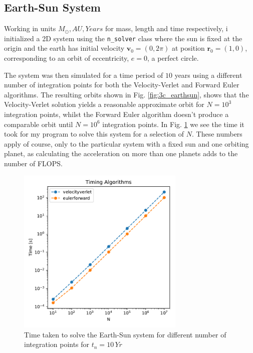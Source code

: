 \documentclass[10pt,showpacs,preprintnumbers,amsmath,amssymb,nofootinbib,aps,prl,twocolumn,groupedaddress,superscriptaddress,showkeys]{revtex4-1}
\begin{document}
  \subsection{Earth-Sun System}

    Working in units $M_\odot, AU, Years$ for mass, length and time respectively, i initialized a 2D system using the \lstinline{n_solver} class where the sun is fixed at the origin and the earth has initial velocity $\mathbf v_0 = (0, 2\pi)$ at position $\mathbf r_0 = (1, 0)$, corresponding to an orbit of eccentricity, $e=0$, a perfect circle.
    

    The system was then simulated for a time period of $10$ years using a different number of integration points for both the Velocity-Verlet and Forward Euler algorithms. The resulting orbits shown in Fig. \ref{fig:3c_earthsun}, shows that the Velocity-Verlet solution yields a reasonable approximate orbit for $N=10^3$ integration points, whilst the Forward Euler algorithm doesn't produce a comparable orbit until $N=10^6$ integration points. In Fig. \ref{fig:timing} we see the time it took for my program to solve this system for a selection of $N$. These numbers apply of course, only to the particular system with a fixed sun and one orbiting planet, as calculating the acceleration on more than one planets adds to the number of FLOPS.

    \begin{figure}[H]
      \center
      \includegraphics[width=8cm]{figs/timing_earthsun.pdf}
      \caption{Time taken to solve the Earth-Sun system for different number of integration points for $t_n=10\, Yr$}
      \label{fig:timing}
    \end{figure}
\end{document}
